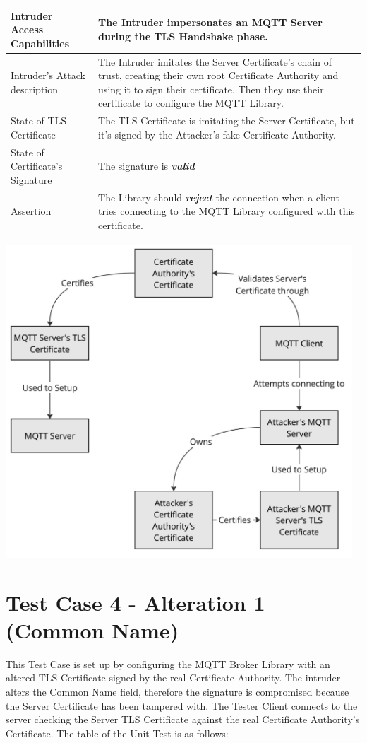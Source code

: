 \documentclass[binding=0.6cm,noexaminfo]{sapthesis}
\begin{document}
\begin{center}
\begin{tabular}{| p{6cm} | p{6cm} |}
\hline
Intruder Access Capabilities & The Intruder impersonates an MQTT Server during the TLS Handshake phase. \\
\hline
Intruder’s Attack description & The Intruder imitates the Server Certificate’s chain of trust, creating their own root Certificate Authority and using it to sign their certificate. Then they use their certificate to configure the MQTT Library. \\
\hline
State of TLS Certificate & The TLS Certificate is imitating the Server Certificate, but it’s signed by the Attacker’s fake Certificate Authority. \\
\hline
State of Certificate’s Signature & The signature is \textbf{\textit{valid}} \\
\hline
Assertion & The Library should \textbf{\textit{reject}} the connection when a client tries connecting to the MQTT Library configured with this certificate. \\
\hline
\end{tabular}
\end{center}

\includegraphics[width=13cm]{TC3}

\newpage
\section{Test Case 4 - Alteration 1 (Common Name)}
This Test Case is set up by configuring the MQTT Broker Library with an altered TLS Certificate signed by the real Certificate Authority. The intruder alters the Common Name field, therefore the signature is compromised because the Server Certificate has been tampered with. The Tester Client connects to the server checking the Server TLS Certificate against the real Certificate Authority’s Certificate. The table of the Unit Test is as follows:
\end{document}
